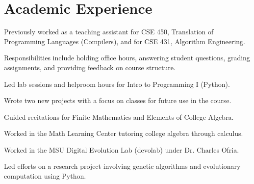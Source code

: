 \documentclass[]{deedy-resume-openfont-rileyannis}
\begin{document}
\begin{minipage}[t]{0.66\textwidth}
\section{Academic Experience}


\begin{tightemize}
\item Previously worked as a teaching assistant for CSE 450, Translation of Programming Languages (Compilers), and for CSE 431, Algorithm Engineering.
\item Responsibilities include holding office hours, answering student questions, grading assignments, and providing feedback on course structure.
\end{tightemize}
\sectionsep

\begin{tightemize}
\item Led lab sessions and helproom hours for Intro to Programming I (Python).
\item Wrote two new projects with a focus on classes for future use in the course.
\end{tightemize}
\sectionsep

\begin{tightemize}
\item Guided recitations for Finite Mathematics and Elements of College Algebra.
\item Worked in the Math Learning Center tutoring college algebra through calculus.
\end{tightemize}
\sectionsep

\begin{tightemize}
\item Worked in the MSU Digital Evolution Lab (devolab) under Dr. Charles Ofria.
\item Led efforts on a research project involving genetic algorithms and evolutionary computation using Python.
\end{tightemize}
\sectionsep




\end{minipage}
\end{document}
